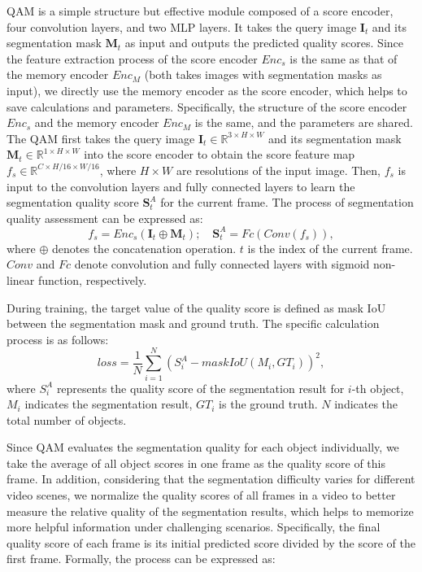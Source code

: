 \documentclass[runningheads]{llncs}
\begin{document}
    QAM is a simple structure but effective module composed of a score encoder, four convolution layers, and two MLP layers. 
    It takes the query image $\mathbf{I}_t$ and its segmentation mask $\mathbf{M}_t$ as input and outputs the predicted quality scores.
    Since the feature extraction process of the score encoder $Enc_{s}$ is the same as that of the memory encoder $Enc_{M}$ (both takes images with segmentation masks as input), we directly use the memory encoder as the score encoder, which helps to save calculations and parameters. 
    Specifically, the structure of the score encoder $Enc_{s}$ and the memory encoder $Enc_{M}$ is the same, and the parameters are shared. 
The QAM first takes the query image $\mathbf{I}_t\in\mathbb{R}^{3\times H\times W}$ and its segmentation mask $\mathbf{M}_t\in\mathbb{R}^{1\times H\times W}$ into the score encoder to obtain the score feature map $f_s\in\mathbb{R}^{C\times H/16\times W/16}$,
    where $H\times W$ are resolutions of the input image. 
    Then, $f_s$ is input to the  convolution layers and fully connected layers to learn the segmentation quality score $\mathbf{S}^A_t$ for the current frame. The process of segmentation quality assessment can be expressed as:
    \vspace{-7pt}
    \begin{equation}
        f_s = {Enc}_s(\mathbf{I}_t \oplus \mathbf{M}_t); \quad
        \mathbf{S}_t^A = \mathit{Fc}(\mathit{Conv}(f_s)),
\end{equation}
where $\oplus$ denotes the concatenation operation. 
    $t$ is the index of the current frame.
    $\mathit{Conv}$  and $\mathit{Fc}$ denote convolution and fully connected layers with sigmoid non-linear function, respectively. 
    
    During training, the target value of the quality score is defined as mask IoU between the segmentation mask and ground truth. 
    The specific calculation process is as follows:
    \begin{equation}
        \textit{loss} = \frac{1}{N} \sum^N_{i=1}(S^A_i-maskIoU(M_i,{GT}_i))^2,
    \end{equation}
    where $S^A_i$ represents the quality score of the segmentation result for $i$-th object, $M_i$ indicates the segmentation result, ${GT}_i$ is the ground truth. $N$ indicates the total number of objects.
    
    
    Since QAM evaluates the segmentation quality for each object individually, we take the average of all object scores in one frame as the quality score of this frame. In addition, considering that the segmentation difficulty varies for different video scenes, we normalize the quality scores of all frames in a video to better measure the relative quality of the segmentation results, which helps to memorize more helpful information under challenging scenarios. Specifically, the final quality score of each frame is its initial predicted score divided by the score of the first frame. Formally, the process can be expressed as:
\end{document}
